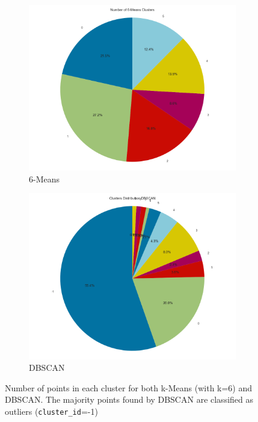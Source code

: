 \documentclass[a4paper,11pt]{article}
\begin{document}
\begin{figure}
\centering
\begin{subfigure}{0.49\linewidth}
    \includegraphics[width=\linewidth]{figures/clustering/6-means_pie.png}
\caption{6-Means}
\label{fig:pie_kmeans}
\end{subfigure}
\begin{subfigure}{0.5\linewidth}
    \includegraphics[width=\linewidth]{figures/clustering/dbscan_pie.png}
\caption{DBSCAN}
\label{fig:pie_dbscan}
\end{subfigure}
\caption{Number of points in each cluster for both k-Means (with k=6) and DBSCAN. The majority points found by DBSCAN are classified as outliers (\texttt{cluster\_id}=-1)}
\end{figure}
\end{document}
